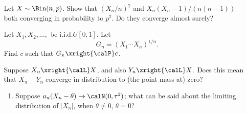 \begin{problem}[DasGupta 7.17]
  Let \(X\sim\Bin(n,p)\). Show that \((X_n/n)^2\) and
  \(X_n(X_n-1)/(n(n-1))\) both converging in probability to \(p^2\). Do
  they converge almost surely?
\end{problem}
\begin{solution}

\end{solution}
\newpage

\begin{problem}[DasGupta 7.21]
  Let \(X_1,X_2,\dotsc,\) be i.i.d.\@ \(U[0,1]\). Let
  \[
    G_n=(X_1\dotsm X_n)^{1/n}.
  \]
  Find \(c\) such that \(G_n\xright{\calP} c\).
\end{problem}
\begin{solution}

\end{solution}
\newpage

\begin{problem}
  Suppose \(X_n\xright{\calL}X\), and also \(Y_n\xright{\calL} X\). Does
  this mean that \(X_n-Y_n\) converge in distribution to (the point mass
  at) zero?
\end{problem}
\begin{solution}

\end{solution}
\newpage

\begin{problem}[DasGupta 7.31 (a)]
  \begin{enumerate}[label=(\alph*),noitemsep]
  \item Suppose \(a_n(X_n-\theta)\to\calN(0,\tau^2)\); what can be said
    about the limiting distribution of \(|X_n|\), when \(\theta\neq 0\),
    \(\theta=0\)?
  \end{enumerate}
\end{problem}
\begin{solution}

\end{solution}

